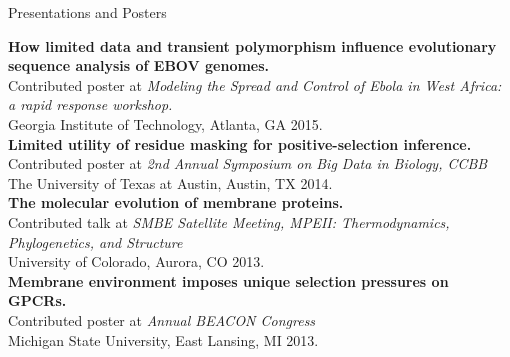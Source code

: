 \documentclass{resume} %
\begin{document}
\vspace*{0.5cm}
\begin{rSection}{Presentations and Posters}
\vspace*{0.25cm}


\textbf{How limited data and transient polymorphism influence evolutionary sequence analysis of EBOV genomes.}
\\Contributed poster at \emph{Modeling the Spread and Control of Ebola in West Africa: a rapid response workshop.}
\\ Georgia Institute of Technology, Atlanta, GA 2015.\\

\textbf{Limited utility of residue masking for positive-selection inference.}
\\Contributed poster at \emph{2nd Annual Symposium on Big Data in Biology, CCBB}
\\ The University of Texas at Austin, Austin, TX 2014.\\

\textbf{The molecular evolution of membrane proteins.}
\\Contributed talk at \emph{SMBE Satellite Meeting, MPEII: Thermodynamics, Phylogenetics, and Structure}
\\ University of Colorado, Aurora, CO 2013.\\

\textbf{Membrane environment imposes unique selection pressures on GPCRs.}
\\Contributed poster at \emph{Annual BEACON Congress}
\\ Michigan State University, East Lansing, MI 2013.


\end{rSection}








\end{document}
